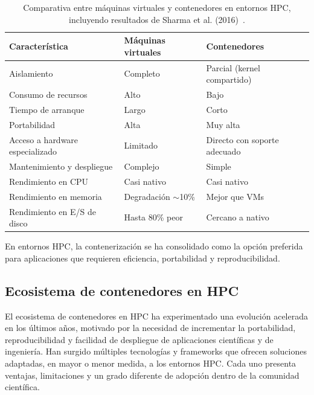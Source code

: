 \begin{table}[ht]
    \centering
    \begin{tabular}{p{4cm} p{4cm} p{4cm}}
        \toprule
        \textbf{Característica}         & \textbf{Máquinas virtuales} & \textbf{Contenedores}        \\
        \midrule
        Aislamiento                     & Completo                    & Parcial (kernel compartido)  \\
        Consumo de recursos             & Alto                        & Bajo                         \\
        Tiempo de arranque              & Largo                       & Corto                        \\
        Portabilidad                    & Alta                        & Muy alta                     \\
        Acceso a hardware especializado & Limitado                    & Directo con soporte adecuado \\
        Mantenimiento y despliegue      & Complejo                    & Simple                       \\
        Rendimiento en CPU              & Casi nativo                 & Casi nativo                  \\
        Rendimiento en memoria          & Degradación $\sim$10\%      & Mejor que VMs                \\
        Rendimiento en E/S de disco     & Hasta 80\% peor             & Cercano a nativo             \\
        \bottomrule
    \end{tabular}
    \caption{Comparativa entre máquinas virtuales y contenedores en entornos \acs{HPC}, incluyendo resultados de Sharma et al. (2016)~\cite{sharma2016containers}.}
    \label{tab:vm_vs_container}
\end{table}

En entornos \acs{HPC}, la contenerización se ha consolidado como la opción preferida para aplicaciones que requieren eficiencia, portabilidad y reproducibilidad.


\subsection{Ecosistema de contenedores en \acs{HPC}}\label{subsec:ecosistema_contenedores}

El ecosistema de contenedores en \acs{HPC} ha experimentado una evolución acelerada en los últimos años, motivado por la necesidad de incrementar la portabilidad, reproducibilidad y facilidad de despliegue de aplicaciones científicas y de ingeniería. Han surgido múltiples tecnologías y frameworks que ofrecen soluciones adaptadas, en mayor o menor medida, a los entornos \acs{HPC}. Cada uno presenta ventajas, limitaciones y un grado diferente de adopción dentro de la comunidad científica.

